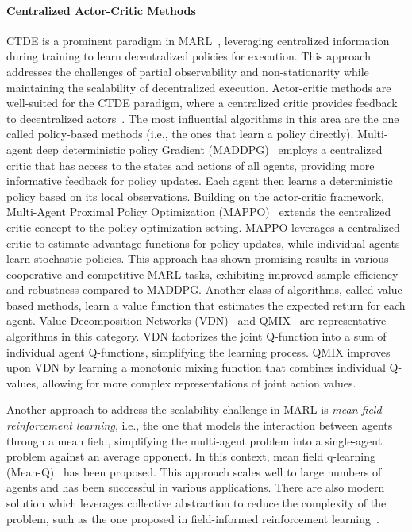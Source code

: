 \documentclass[sigconf]{acmart}
\begin{document}
\paragraph{Centralized Actor-Critic Methods} CTDE is a prominent paradigm in MARL~\cite{ning2024survey}, 
leveraging centralized information during training to learn decentralized policies for execution. 
This approach addresses the challenges of partial observability and non-stationarity while maintaining the scalability of decentralized execution. %
Actor-critic methods are well-suited for the CTDE paradigm, 
where a centralized critic provides feedback to decentralized actors~\cite{DBLP:conf/icml/RashidSWFFW18,DBLP:journals/corr/SunehagLGCZJLSL17,yu2022surprising,DBLP:conf/nips/LoweWTHAM17}. 
% 
The most influential algorithms in this area are the one called policy-based methods (i.e., the ones that learn a policy directly).
%
Multi-agent deep deterministic policy Gradient (MADDPG)~\cite{DBLP:conf/nips/LoweWTHAM17} employs a centralized critic that has access to the states and actions of all agents, providing more informative feedback for policy updates. 
Each agent then learns a deterministic policy based on its local observations. %
Building on the actor-critic framework, Multi-Agent Proximal Policy Optimization (MAPPO)~\cite{yu2022surprising} extends the centralized critic concept to the policy optimization setting. 
MAPPO leverages a centralized critic to estimate advantage functions for policy updates, while individual agents learn stochastic policies. 
This approach has shown promising results in various cooperative and competitive MARL tasks, exhibiting improved sample efficiency and robustness compared to MADDPG. %
Another class of algorithms, called value-based methods, learn a value function that estimates the expected return for each agent.
%
Value Decomposition Networks (VDN)~\cite{DBLP:journals/corr/SunehagLGCZJLSL17} and QMIX~\cite{DBLP:conf/icml/RashidSWFFW18} are representative algorithms in this category. 
VDN factorizes the joint Q-function into a sum of individual agent Q-functions, simplifying the learning process. 
QMIX improves upon VDN by learning a monotonic mixing function that combines individual Q-values, 
allowing for more complex representations of joint action values. %

Another approach to address the scalability challenge in MARL is \emph{mean field reinforcement learning}, i.e., the one that models the interaction between agents through a mean field, simplifying the multi-agent problem into a single-agent problem against an average opponent.
%
In this context, mean field q-learning (Mean-Q)~\cite{DBLP:conf/icml/YangLLZZW18} has been proposed.
This approach scales well to large numbers of agents and has been successful in various applications. 
% 
There are also modern solution which leverages collective abstraction to reduce the complexity of the problem, such as the one proposed in field-informed reinforcement learning~\cite{DBLP:conf/acsos/AguzziVE23}.
\end{document}
